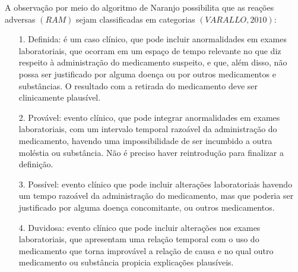 \documentclass[svgnames,12pt,oneside, openright,a4paper]{scrbook}
\begin{document}
A observação por meio do algoritmo de Naranjo possibilita que as reações adversas $(RAM)$ sejam classificadas em categorias $(VARALLO, 2010)$: 

\begin{enumerate}

\item[1.] Definida: é um caso clínico, que pode incluir anormalidades em exames laboratoriais, que ocorram em um espaço de tempo relevante no que diz respeito à administração do medicamento suspeito, e que, além disso, não possa ser justificado por alguma doença ou por outros medicamentos e substâncias.  O resultado com a retirada do medicamento deve ser clinicamente plausível. 

\item[2.] Provável: evento clínico, que pode integrar anormalidades em exames laboratoriais, com um intervalo temporal razoável da administração do medicamento, havendo uma impossibilidade de ser incumbido a outra moléstia ou substância. Não é preciso haver reintrodução para finalizar a definição. 

\item[3.] Possível: evento clínico que pode incluir alterações laboratoriais havendo um tempo razoável da administração do medicamento, mas que poderia ser justificado por alguma doença concomitante, ou outros medicamentos.

\item[4.] Duvidosa: evento clínico que pode incluir alterações nos exames laboratoriais, que apresentam uma relação temporal com o uso do medicamento que torna improvável a relação de causa e no qual outro medicamento ou substância propicia explicações plausíveis.

\end{enumerate}
   

\end{document}
